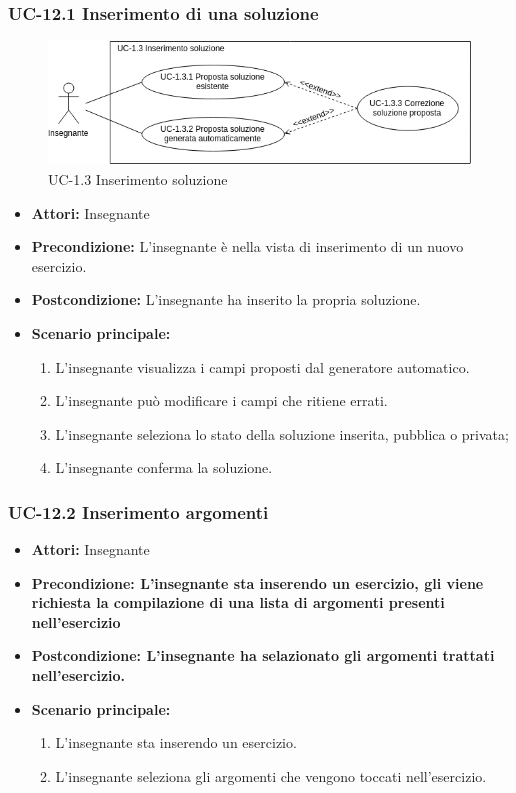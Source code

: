 \subsubsection{UC-12.1 Inserimento di una soluzione}
\begin{figure}[htbp]
	\centering
	\includegraphics[scale=0.7]{images/UC-1_3.png}
	\caption{UC-1.3 Inserimento soluzione}
\end{figure}
\begin{itemize}
\item \textbf{Attori: }Insegnante
\item \textbf{Precondizione: }L'insegnante è nella vista di inserimento di un nuovo esercizio.
\item \textbf{Postcondizione: }L'insegnante ha inserito la propria soluzione.
\item \textbf{Scenario principale: }
		\begin{enumerate} 
		\item L'insegnante visualizza i campi proposti dal generatore automatico. 
		\item L'insegnante può modificare i campi che ritiene errati.
		\item L'insegnante seleziona lo stato della soluzione inserita, pubblica o privata;
		\item L'insegnante conferma la soluzione.
		\end{enumerate}	
\end{itemize}

\subsubsection{UC-12.2 Inserimento argomenti}
\begin{itemize}
\item \textbf{Attori: }Insegnante

\item \textbf{Precondizione: L'insegnante sta inserendo un esercizio, gli viene richiesta la compilazione di una lista di argomenti presenti nell'esercizio}
\item \textbf{Postcondizione: L'insegnante ha selazionato gli argomenti trattati nell'esercizio.}
\item \textbf{Scenario principale: }
		\begin{enumerate}
		\item L'insegnante sta inserendo un esercizio. 
		\item L'insegnante seleziona gli argomenti che vengono toccati nell'esercizio. 
		\end{enumerate}
\end{itemize}

